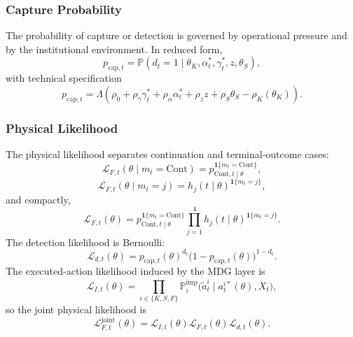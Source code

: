 \documentclass[12pt,a4paper]{article}
\theoremstyle{plain}
\theoremstyle{definition}
\theoremstyle{remark}
\newcommand{\ProbE}{\mathbb{P}}
\newcommand{\ProbI}[1]{\mathbb{P}_{#1}^{\mathrm{imp}}}
\newcommand{\1}{\mathbf{1}}
\begin{document}
\subsubsection{Capture Probability}
\label{subsec:prob-captura}

The probability of capture or detection is governed by operational pressure and by the
institutional environment. In reduced form,
\begin{equation}
\label{eq:p-cap-def}
p_{\mathrm{cap},t}
=\ProbE(d_t=1\mid\theta_K,\alpha_t^\ast,\gamma_t^\ast,z,\theta_S),
\end{equation}
with technical specification
\begin{equation}
\label{eq:p-cap-tecnica}
p_{\mathrm{cap},t}
=
\Lambda\!\left(\rho_0+\rho_\gamma\gamma_t^\ast+\rho_\alpha\alpha_t^\ast
+\rho_z z+\rho_S\theta_S-\rho_K(\theta_K)\right).
\end{equation}

\subsubsection{Physical Likelihood}
\label{subsec:verosimilitud-fisica}

The physical likelihood separates continuation and terminal-outcome cases:
\begin{equation}
\label{eq:LH-cont}
\mathcal L_{F,t}(\theta\mid m_t=\mathrm{Cont})
=p_{\mathrm{Cont},t\mid\theta}^{\mathbf 1\{m_t=\mathrm{Cont}\}},
\end{equation}
\begin{equation}
\label{eq:LH-out}
\mathcal L_{F,t}(\theta\mid m_t=j)
=h_j(t\mid\theta)^{\mathbf 1\{m_t=j\}},
\end{equation}
and compactly,
\begin{equation}
\label{eq:LH-compacta}
\mathcal L_{F,t}(\theta)
=
p_{\mathrm{Cont},t\mid\theta}^{\mathbf 1\{m_t=\mathrm{Cont}\}}
\prod_{j=1}^{4}h_j(t\mid\theta)^{\mathbf 1\{m_t=j\}}.
\end{equation}
The detection likelihood is Bernoulli:
\begin{equation}
\label{eq:Ld-bernoulli}
\mathcal L_{d,t}(\theta)
=p_{\mathrm{cap},t}(\theta)^{d_t}\bigl(1-p_{\mathrm{cap},t}(\theta)\bigr)^{1-d_t}.
\end{equation}
The executed-action likelihood induced by the MDG layer is
\begin{equation}
\label{eq:LI-atilde}
\mathcal L_{I,t}(\theta)
=\prod_{i\in\{K,S,F\}}\ProbI{i}\bigl(\tilde a_t^i\mid a_t^{i\ast}(\theta),X_t\bigr),
\end{equation}
so the joint physical likelihood is
\begin{equation}
\label{eq:LH-joint}
\mathcal L_{F,t}^{\mathrm{joint}}(\theta)
=\mathcal L_{I,t}(\theta)\mathcal L_{F,t}(\theta)\mathcal L_{d,t}(\theta).
\end{equation}
\end{document}
